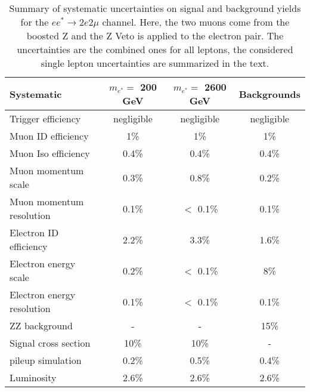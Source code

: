 \begin{table}[h!]
\begin{center}
\begin{tabular}{lccc}
\hline
Systematic & $m_{e^{*}} =$ 200 GeV & $m_{e^{*}} =$ 2600 GeV & Backgrounds \\
\hline
Trigger efficiency & negligible & negligible & negligible \\
Muon ID efficiency & 1\% & 1\% & 1\% \\
Muon Iso efficiency & 0.4\% & 0.4\% & 0.4\% \\
Muon momentum scale & 0.3\% & 0.8\% & 0.2\% \\
Muon momentum resolution & 0.1\% & $<$ 0.1\% & 0.1\% \\
Electron ID efficiency & 2.2\% & 3.3\% & 1.6\% \\
Electron energy scale & 0.2\% & $<$ 0.1\% & 8\% \\
Electron energy resolution & 0.1\% & $<$ 0.1\% & 0.1\% \\
ZZ background & - & - & 15\% \\
Signal cross section & 10\% & 10\% & - \\
pileup simulation & 0.2\% & 0.5\% & 0.4\% \\
Luminosity & 2.6\% & 2.6\% & 2.6\% \\
\hline

\end{tabular}
\end{center}
\caption{\label{tab:uncertainties2}Summary of systematic uncertainties on signal and background yields for the $ee^{*}\rightarrow 2e2\mu$ channel. Here, the two muons come from the boosted Z and the Z Veto is applied to the electron pair. The uncertainties are the combined ones for all leptons, the considered single lepton uncertainties are summarized in the text.}
\end{table}

\clearpage
